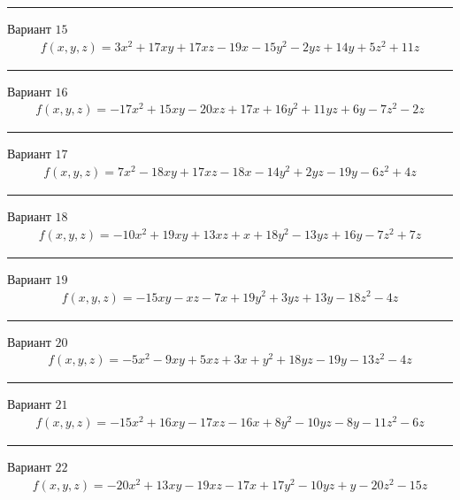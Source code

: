 \documentclass[11pt]{report}
\begin{document}
\begin{center}
\noindent\rule{8cm}{0.4pt}
\end{center}
Вариант $15$
\begin{align*}
    f(x, y, z) = 3 x^{2} + 17 x y + 17 x z - 19 x - 15 y^{2} - 2 y z + 14 y + 5 z^{2} + 11 z
\end{align*}
\begin{center}
\noindent\rule{8cm}{0.4pt}
\end{center}
Вариант $16$
\begin{align*}
    f(x, y, z) = - 17 x^{2} + 15 x y - 20 x z + 17 x + 16 y^{2} + 11 y z + 6 y - 7 z^{2} - 2 z
\end{align*}
\begin{center}
\noindent\rule{8cm}{0.4pt}
\end{center}
Вариант $17$
\begin{align*}
    f(x, y, z) = 7 x^{2} - 18 x y + 17 x z - 18 x - 14 y^{2} + 2 y z - 19 y - 6 z^{2} + 4 z
\end{align*}
\begin{center}
\noindent\rule{8cm}{0.4pt}
\end{center}
Вариант $18$
\begin{align*}
    f(x, y, z) = - 10 x^{2} + 19 x y + 13 x z + x + 18 y^{2} - 13 y z + 16 y - 7 z^{2} + 7 z
\end{align*}
\begin{center}
\noindent\rule{8cm}{0.4pt}
\end{center}
Вариант $19$
\begin{align*}
    f(x, y, z) = - 15 x y - x z - 7 x + 19 y^{2} + 3 y z + 13 y - 18 z^{2} - 4 z
\end{align*}
\begin{center}
\noindent\rule{8cm}{0.4pt}
\end{center}
Вариант $20$
\begin{align*}
    f(x, y, z) = - 5 x^{2} - 9 x y + 5 x z + 3 x + y^{2} + 18 y z - 19 y - 13 z^{2} - 4 z
\end{align*}
\begin{center}
\noindent\rule{8cm}{0.4pt}
\end{center}
Вариант $21$
\begin{align*}
    f(x, y, z) = - 15 x^{2} + 16 x y - 17 x z - 16 x + 8 y^{2} - 10 y z - 8 y - 11 z^{2} - 6 z
\end{align*}
\begin{center}
\noindent\rule{8cm}{0.4pt}
\end{center}
Вариант $22$
\begin{align*}
    f(x, y, z) = - 20 x^{2} + 13 x y - 19 x z - 17 x + 17 y^{2} - 10 y z + y - 20 z^{2} - 15 z
\end{align*}
\end{document}
